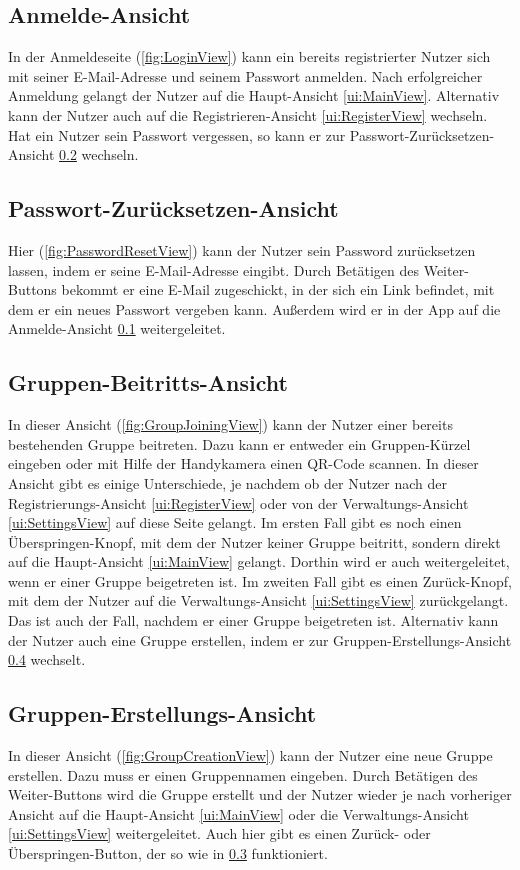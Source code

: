 \documentclass[parskip=full]{scrartcl}
\begin{document}
\subsection{Anmelde-Ansicht}
\label{ui:LoginView}
In der Anmeldeseite (\autoref{fig:LoginView}) kann ein bereits registrierter Nutzer sich mit seiner E-Mail-Adresse und seinem Passwort anmelden. Nach erfolgreicher Anmeldung gelangt der Nutzer auf die Haupt-Ansicht \ref{ui:MainView}. Alternativ kann der Nutzer auch auf die Registrieren-Ansicht \ref{ui:RegisterView} wechseln.
Hat ein Nutzer sein Passwort vergessen, so kann er zur Passwort-Zurücksetzen-Ansicht \ref{ui:PasswordResetView} wechseln.

\subsection{Passwort-Zurücksetzen-Ansicht}
\label{ui:PasswordResetView}
Hier (\autoref{fig:PasswordResetView}) kann der Nutzer sein Password zurücksetzen lassen, indem er seine E-Mail-Adresse eingibt. Durch Betätigen des Weiter-Buttons bekommt er eine E-Mail zugeschickt, in der sich ein Link befindet, mit dem er ein neues Passwort vergeben kann. Außerdem wird er in der App auf die Anmelde-Ansicht \ref{ui:LoginView} weitergeleitet.

\subsection{Gruppen-Beitritts-Ansicht}
\label{ui:GroupJoiningView}
In dieser Ansicht (\autoref{fig:GroupJoiningView}) kann der Nutzer einer bereits bestehenden Gruppe beitreten. Dazu kann er entweder ein Gruppen-Kürzel eingeben oder mit Hilfe der Handykamera einen QR-Code scannen. In dieser Ansicht gibt es einige Unterschiede, je nachdem ob der Nutzer nach der Registrierungs-Ansicht \ref{ui:RegisterView} oder von der Verwaltungs-Ansicht \ref{ui:SettingsView} auf diese Seite gelangt. Im ersten Fall gibt es noch einen Überspringen-Knopf, mit dem der Nutzer keiner Gruppe beitritt, sondern direkt auf die Haupt-Ansicht \ref{ui:MainView} gelangt. Dorthin wird er auch weitergeleitet, wenn er einer Gruppe beigetreten ist. Im zweiten Fall gibt es einen Zurück-Knopf, mit dem der Nutzer auf die Verwaltungs-Ansicht \ref{ui:SettingsView} zurückgelangt. Das ist auch der Fall, nachdem er einer Gruppe beigetreten ist.
Alternativ kann der Nutzer auch eine Gruppe erstellen, indem er zur Gruppen-Erstellungs-Ansicht \ref{ui:GroupCreationView} wechselt.

\subsection{Gruppen-Erstellungs-Ansicht}
\label{ui:GroupCreationView}
In dieser Ansicht (\autoref{fig:GroupCreationView}) kann der Nutzer eine neue Gruppe erstellen. Dazu muss er einen Gruppennamen eingeben. Durch Betätigen des Weiter-Buttons wird die Gruppe erstellt und der Nutzer wieder je nach vorheriger Ansicht auf die Haupt-Ansicht \ref{ui:MainView} oder die Verwaltungs-Ansicht \ref{ui:SettingsView} weitergeleitet. Auch hier gibt es einen Zurück- oder Überspringen-Button, der so wie in \ref{ui:GroupJoiningView} funktioniert.
\end{document}
